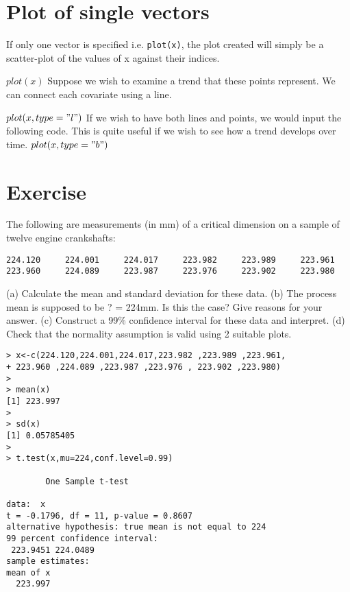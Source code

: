 \documentclass[a4paper,12pt]{article}
\begin{document}
\begin{itemize}
\begin{itemize}
\section{Plot of single vectors}
If only one vector is specified i.e. \texttt{plot(x)},  the plot created will simply be a scatter-plot of the values of x against their indices.

$plot(x)$
Suppose we wish to examine a trend that these points represent. We can connect each covariate using a line.

$plot(x, type = "l")$
If we wish to have both lines and points, we would input the following code. This is quite useful if we wish to see how a trend develops over time.
$plot(x, type = "b")$









\section{Exercise} The following are measurements (in mm) of a critical
dimension on a sample of twelve engine crankshafts:

\begin{verbatim}
224.120 	224.001 	224.017 	223.982 	223.989 	223.961
223.960 	224.089 	223.987 	223.976 	223.902 	223.980
\end{verbatim}
(a) Calculate the mean and standard deviation for these data.
(b) The process mean is supposed to be ? = 224mm. Is this the
case? Give reasons for your answer.
(c) Construct a 99\% confidence interval for these data and interpret.
(d) Check that the normality assumption is valid using 2 suitable plots.

\begin{verbatim}
> x<-c(224.120,224.001,224.017,223.982 ,223.989 ,223.961,
+ 223.960 ,224.089 ,223.987 ,223.976 , 223.902 ,223.980)
>
> mean(x)
[1] 223.997
>
> sd(x)
[1] 0.05785405
>
> t.test(x,mu=224,conf.level=0.99)

        One Sample t-test

data:  x
t = -0.1796, df = 11, p-value = 0.8607
alternative hypothesis: true mean is not equal to 224
99 percent confidence interval:
 223.9451 224.0489
sample estimates:
mean of x
  223.997

\end{verbatim}

\end{itemize}
\end{itemize}
\end{document}
